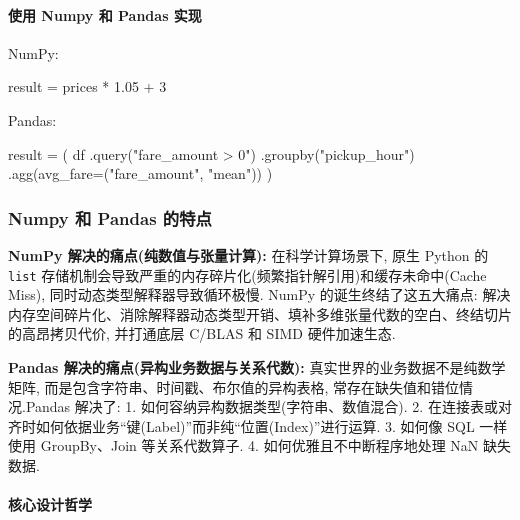 \documentclass[11pt]{article}
\newenvironment{Shaded}{}{}
\newcommand{\DecValTok}[1]{\textcolor[rgb]{0.25,0.63,0.44}{{#1}}}
\newcommand{\FloatTok}[1]{\textcolor[rgb]{0.25,0.63,0.44}{{#1}}}
\newcommand{\StringTok}[1]{\textcolor[rgb]{0.25,0.44,0.63}{{#1}}}
\newcommand{\NormalTok}[1]{{#1}}
\newcommand{\OperatorTok}[1]{\textcolor[rgb]{0.40,0.40,0.40}{{#1}}}
\begin{document}
    \paragraph{使用 Numpy 和 Pandas
实现}\label{ux4f7fux7528-numpy-ux548c-pandas-ux5b9eux73b0}

    NumPy:

\begin{Shaded}
\begin{Highlighting}[]
\NormalTok{result }\OperatorTok{=}\NormalTok{ prices }\OperatorTok{*} \FloatTok{1.05} \OperatorTok{+} \DecValTok{3}
\end{Highlighting}
\end{Shaded}

Pandas:

\begin{Shaded}
\begin{Highlighting}[]
\NormalTok{result }\OperatorTok{=}\NormalTok{ (}
\NormalTok{    df}
\NormalTok{    .query(}\StringTok{"fare\_amount \textgreater{} 0"}\NormalTok{)}
\NormalTok{    .groupby(}\StringTok{"pickup\_hour"}\NormalTok{)}
\NormalTok{    .agg(avg\_fare}\OperatorTok{=}\NormalTok{(}\StringTok{"fare\_amount"}\NormalTok{, }\StringTok{"mean"}\NormalTok{))}
\NormalTok{)}
\end{Highlighting}
\end{Shaded}

    \subsubsection{Numpy 和 Pandas
的特点}\label{numpy-ux548c-pandas-ux7684ux7279ux70b9}

    \textbf{NumPy 解决的痛点(纯数值与张量计算):} 在科学计算场景下, 原生
Python 的 \texttt{list}
存储机制会导致严重的内存碎片化(频繁指针解引用)和缓存未命中(Cache Miss),
同时动态类型解释器导致循环极慢. NumPy 的诞生终结了这五大痛点:
解决内存空间碎片化、消除解释器动态类型开销、填补多维张量代数的空白、终结切片的高昂拷贝代价,
并打通底层 C/BLAS 和 SIMD 硬件加速生态.

\textbf{Pandas 解决的痛点(异构业务数据与关系代数):}
真实世界的业务数据不是纯数学矩阵,
而是包含字符串、时间戳、布尔值的异构表格, 常存在缺失值和错位情况.Pandas
解决了: 1. 如何容纳异构数据类型(字符串、数值混合). 2.
在连接表或对齐时如何依据业务``键(Label)''而非纯``位置(Index)''进行运算.
3. 如何像 SQL 一样使用 GroupBy、Join 等关系代数算子. 4.
如何优雅且不中断程序地处理 NaN 缺失数据.

    \paragraph{核心设计哲学}\label{ux6838ux5fc3ux8bbeux8ba1ux54f2ux5b66}
\end{document}
